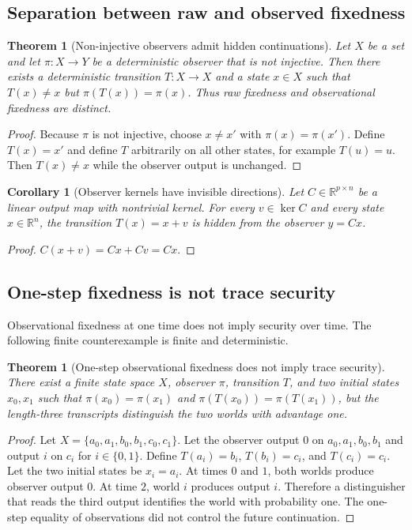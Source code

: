 \documentclass[11pt]{article}
\theoremstyle{definition}
\theoremstyle{plain}
\newtheorem{theorem}[definition]{Theorem}
\newtheorem{corollary}[definition]{Corollary}
\theoremstyle{remark}
\newcommand{\R}{\mathbb{R}}
\begin{document}
\subsection{Separation between raw and observed fixedness}

\begin{theorem}[Non-injective observers admit hidden continuations]
Let $X$ be a set and let $\pi:X\to Y$ be a deterministic observer that is not injective. Then there exists a deterministic transition $T:X\to X$ and a state $x\in X$ such that $T(x)\ne x$ but $\pi(T(x))=\pi(x)$. Thus raw fixedness and observational fixedness are distinct.
\end{theorem}

\begin{proof}
Because $\pi$ is not injective, choose $x\ne x'$ with $\pi(x)=\pi(x')$. Define $T(x)=x'$ and define $T$ arbitrarily on all other states, for example $T(u)=u$. Then $T(x)\ne x$ while the observer output is unchanged.
\end{proof}

\begin{corollary}[Observer kernels have invisible directions]
Let $C\in\R^{p\times n}$ be a linear output map with nontrivial kernel. For every $v\in\ker C$ and every state $x\in\R^n$, the transition $T(x)=x+v$ is hidden from the observer $y=Cx$.
\end{corollary}

\begin{proof}
$C(x+v)=Cx+Cv=Cx$.
\end{proof}

\subsection{One-step fixedness is not trace security}

Observational fixedness at one time does not imply security over time. The following finite counterexample is finite and deterministic.

\begin{theorem}[One-step observational fixedness does not imply trace security]
There exist a finite state space $X$, observer $\pi$, transition $T$, and two initial states $x_0,x_1$ such that $\pi(x_0)=\pi(x_1)$ and $\pi(T(x_0))=\pi(T(x_1))$, but the length-three transcripts distinguish the two worlds with advantage one.
\end{theorem}

\begin{proof}
Let $X=\{a_0,a_1,b_0,b_1,c_0,c_1\}$. Let the observer output $0$ on $a_0,a_1,b_0,b_1$ and output $i$ on $c_i$ for $i\in\{0,1\}$. Define $T(a_i)=b_i$, $T(b_i)=c_i$, and $T(c_i)=c_i$. Let the two initial states be $x_i=a_i$. At times $0$ and $1$, both worlds produce observer output $0$. At time $2$, world $i$ produces output $i$. Therefore a distinguisher that reads the third output identifies the world with probability one. The one-step equality of observations did not control the future continuation.
\end{proof}
\end{document}
